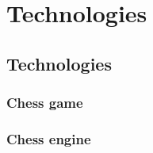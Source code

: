 \chapter{Technologies}
\label{chap:ch5}

\section{Technologies}
\label{sec:ch5sec1}


\subsection{Chess game}
\label{subsec:ch5sec1subsec1}


\subsection{Chess engine}
\label{subsec:ch5sec1subsec2}

